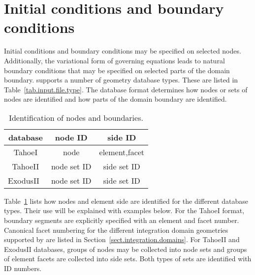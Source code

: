 
\section{Initial conditions and boundary conditions}
\label{set.ICandBC}
Initial conditions and boundary conditions may be specified on 
selected nodes. Additionally, the variational form 
of governing equations leads to natural boundary conditions that may 
be specified on selected parts of the domain boundary. \tahoe 
supports a number of geometry database types. These are listed in 
Table~\ref{tab.input.file.type}. The database format determines how 
nodes or sets of nodes are identified and how parts of the domain 
boundary are identified.
\begin{table}[h]
\begin{center}
\caption{\label{tab.BC.type} Identification of nodes and 
boundaries.}
\begin{tabular}[c]{|c|c|c|}
\hline
 \parbox[b]{1.25in}{\centering \textbf{database}}
&\parbox[b]{1.5in}{\centering \textbf{node ID}}
&\parbox[b]{1.5in}{\centering \textbf{side ID}}\\
\hline
  \parbox[b]{1.25in}{\centering TahoeI}
& \parbox[b]{1.5in}{\centering node}
& \parbox[b]{1.5in}{\centering element,facet} \\
\hline
  \parbox[b]{1.25in}{\centering TahoeII}
& \parbox[b]{1.5in}{\centering node set ID}
& \parbox[b]{1.5in}{\centering side set ID} \\
\hline
  \parbox[b]{1.25in}{\centering \textsf{ExodusII}~\cite{ExodusII}}
& \parbox[b]{1.5in}{\centering node set ID}
& \parbox[b]{1.5in}{\centering side set ID} \\
\hline
\end{tabular}
\end{center}
\end{table}
Table~\ref{tab.BC.type} lists how nodes and element side are 
identified for the different database types. Their use will be 
explained with examples below. For the TahoeI format, boundary 
segments are explicitly specified with an element and facet number. 
Canonical facet numbering for the different integration domain 
geometries supported by \tahoe are listed in 
Section~\ref{sect.integration.domains}. For TahoeII and 
\textsf{ExodusII} databases, groups of nodes may be collected into 
node sets and groups of element facets are collected into side sets. 
Both types of sets are identified with ID numbers.

